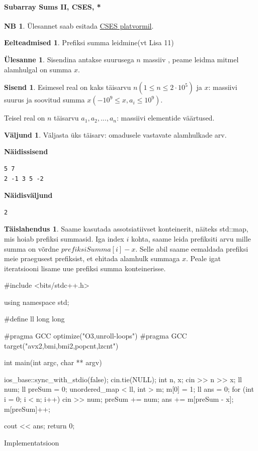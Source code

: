 \documentclass{trkut}
\theoremstyle{definition}
\newtheorem*{prereq}{Eelteadmised}
\newtheorem*{extra}{NB}
\newtheorem*{solution}{Täislahendus}
\newtheorem*{Input}{Sisend}
\newtheorem*{Output}{Väljund}
\newtheorem*{Text}{Ülesanne}
\begin{document}
\paragraph{Subarray Sums II, CSES, *}
\begin{extra}
Ülesannet saab esitada \href{https://cses.fi/problemset/task/1661}{CSES platvormil}.
\end{extra}
\begin{prereq}
Prefiksi summa leidmine(vt Lisa 11)
\end{prereq}
\begin{Text}
Sisendina antakse suurusega $n$ massiiv , peame leidma mitmel alamhulgal on summa $x$.

\parencite{sums}
\end{Text}
\begin{Input}
Esimesel real on kaks täisarvu $n$$(1\le n\le 2\cdot 10^5)$ ja $x$: massiivi suurus ja soovitud summa $x$$(-10^9\le x,a_i\le 10^9)$.

Teisel real on $n$ täisarvu $a_1,a_2,...,a_n$: massiivi elementide väärtused.
\end{Input}
\begin{Output}
Väljasta üks täisarv: omadusele vastavate alamhulkade arv.
\end{Output}

\textbf{Näidissisend}

\begin{verbatim}
5 7
2 -1 3 5 -2
\end{verbatim}

\textbf{Näidisväljund}

\begin{verbatim}
2
\end{verbatim}

\begin{solution}
Saame kasutada assotsiatiivset konteinerit, näiteks std::map, mis hoiab prefiksi summasid. Iga index $i$ kohta, saame leida prefiksiti arvu mille summa on võrdne $prefiksiSumma[i]-x$. Selle abil saame eemaldada prefiksi meie praegusest prefiksist, et ehitada alamhulk summaga $x$. Peale igat iteratsiooni lisame uue prefiksi summa konteinerisse.
\end{solution}


\begin{cclol}
#include <bits/stdc++.h>

using namespace std;

#define ll long long

#pragma GCC optimize("O3,unroll-loops")
#pragma GCC target("avx2,bmi,bmi2,popcnt,lzcnt")

int main(int argc, char ** argv) {
  ios_base::sync_with_stdio(false);
  cin.tie(NULL);
  int n, x;
  cin >> n >> x;
  ll num;
  ll preSum = 0;
  unordered_map < ll, int > m;
  m[0] = 1;
  ll ans = 0;
  for (int i = 0; i < n; i++) {
    cin >> num;
    preSum += num;
    ans += m[preSum - x];
    m[preSum]++;
  }

  cout << ans;
  return 0;
}
\end{cclol}
\begin{kk}[H]
\caption{Implementatsioon}%
\end{kk}
\end{document}
